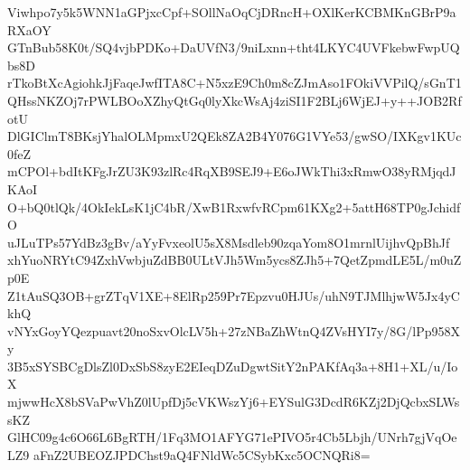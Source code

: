 Viwhpo7y5k5WNN1aGPjxcCpf+SOllNaOqCjDRncH+OXlKerKCBMKnGBrP9aRXaOY
GTnBub58K0t/SQ4vjbPDKo+DaUVfN3/9niLxnn+tht4LKYC4UVFkebwFwpUQbs8D
rTkoBtXcAgiohkJjFaqeJwfITA8C+N5xzE9Ch0m8cZJmAso1FOkiVVPilQ/sGnT1
QHssNKZOj7rPWLBOoXZhyQtGq0lyXkcWsAj4ziSI1F2BLj6WjEJ+y++JOB2RfotU
DlGIClmT8BKsjYhalOLMpmxU2QEk8ZA2B4Y076G1VYe53/gwSO/IXKgv1KUc0feZ
mCPOl+bdItKFgJrZU3K93zlRc4RqXB9SEJ9+E6oJWkThi3xRmwO38yRMjqdJKAoI
O+bQ0tlQk/4OkIekLsK1jC4bR/XwB1RxwfvRCpm61KXg2+5attH68TP0gJchidfO
uJLuTPs57YdBz3gBv/aYyFvxeolU5sX8Msdleb90zqaYom8O1mrnlUijhvQpBhJf
xhYuoNRYtC94ZxhVwbjuZdBB0ULtVJh5Wm5ycs8ZJh5+7QetZpmdLE5L/m0uZp0E
Z1tAuSQ3OB+grZTqV1XE+8ElRp259Pr7Epzvu0HJUs/uhN9TJMlhjwW5Jx4yCkhQ
vNYxGoyYQezpuavt20noSxvOlcLV5h+27zNBaZhWtnQ4ZVsHYI7y/8G/lPp958Xy
3B5xSYSBCgDlsZl0DxSbS8zyE2EIeqDZuDgwtSitY2nPAKfAq3a+8H1+XL/u/IoX
mjwwHcX8bSVaPwVhZ0lUpfDj5cVKWszYj6+EYSulG3DcdR6KZj2DjQcbxSLWssKZ
GlHC09g4c6O66L6BgRTH/1Fq3MO1AFYG71ePIVO5r4Cb5Lbjh/UNrh7gjVqOeLZ9
aFnZ2UBEOZJPDChst9aQ4FNldWc5CSybKxc5OCNQRi8=
